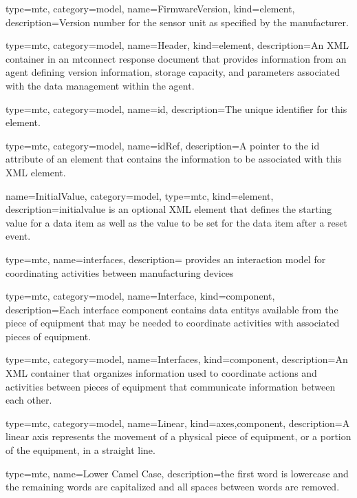 {
  type=mtc,
  category=model,
  name={FirmwareVersion},
  kind={element},
  description={Version number for the sensor unit as specified by the manufacturer.}
}


{
  type=mtc,
  category=model,
  name={Header},
  kind={element},
  description={An XML container in an \gls{mtconnect response document} that provides information from an \gls{agent} defining version information, storage capacity, and parameters associated with the data management within the \gls{agent}.}
}


{
  type=mtc,
  category=model,
  name={id},
  description={The unique identifier for this element.}
}


{
  type=mtc,
  category=model,
  name={idRef},
  description={A pointer to the \gls{id} attribute of an element that contains the information to be associated with this XML element.}
}


{
  name={InitialValue},
  category=model,
  type=mtc,
  kind={element},
  description={\gls{initialvalue} is an optional XML element that defines the starting value for a data item as well as the value to be set for the data item after a reset event.}
}


{
  type=mtc,
  name=interfaces,
  description={ provides an interaction model for coordinating activities between manufacturing devices}
}


{
  type=mtc,
  category=model,
  name={Interface},
  kind={component},
  description={Each \gls{interface component} contains \glspl{data entity} available from the piece of equipment that may be needed to coordinate activities with associated pieces of equipment.}
}

{
  type=mtc,
  category=model,
  name={Interfaces},
  kind={component},
  description={An XML container that organizes information used to coordinate actions and activities between pieces of equipment that communicate information between each other. }
}


{
  type=mtc,
  category=model,
  name={Linear},
  kind={axes,component},
  description={A \gls{linear} axis represents the movement of a physical piece of equipment, or a portion of the equipment, in a straight line. }
}


{
  type=mtc,
  name={Lower Camel Case},
  description={the first word is lowercase and the remaining words are capitalized and all spaces between words are removed.}
}


